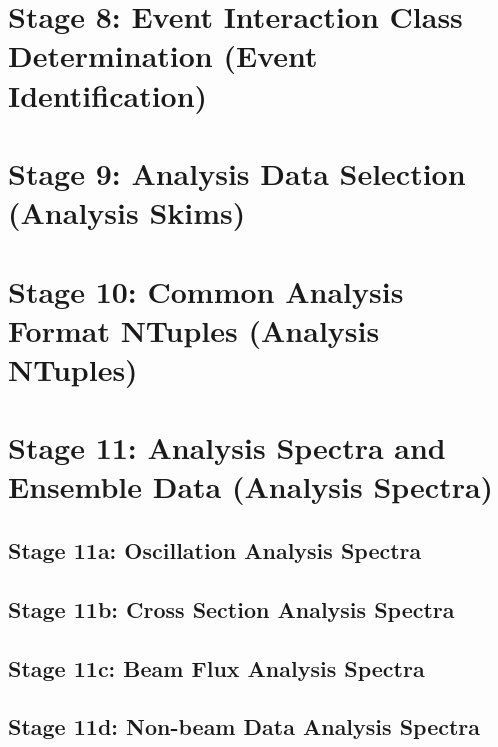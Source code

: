 \section{Stage 8: Event Interaction Class Determination (Event Identification)}
\section{Stage 9: Analysis Data Selection (Analysis Skims)}
\section{Stage 10: Common Analysis Format NTuples (Analysis  NTuples)}
\section{Stage 11: Analysis Spectra and Ensemble Data (Analysis Spectra)}
\subsection{Stage 11a: Oscillation Analysis Spectra}
\subsection{Stage 11b: Cross Section Analysis Spectra}
\subsection{Stage 11c: Beam Flux Analysis Spectra}
\subsection{Stage 11d: Non-beam Data Analysis Spectra}















